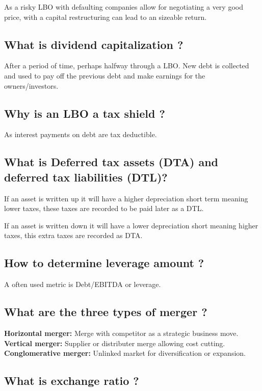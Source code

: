 \documentclass[11pt]{scrartcl} %
\begin{document}
As a risky LBO with defaulting companies allow for negotiating a very good price, with a capital restructuring can lead to an sizeable return.

\subsection{What is dividend capitalization ?}

After a period of time, perhaps halfway through a LBO. New debt is collected and used to pay off the previous debt and make earnings for the owners/investors. 

\subsection{Why is an LBO a tax shield ?}

As interest payments on debt are tax deductible.

\subsection{What is Deferred tax assets (DTA) and deferred tax liabilities (DTL)?}

If an asset is written up it will have a higher depreciation short term meaning lower taxes, these taxes are recorded to be paid later as a DTL.

If an asset is written down it will have a lower depreciation short meaning higher taxes, this extra taxes are recorded as DTA.

\subsection{How to determine leverage amount ?}

A often used metric is Debt/EBITDA or leverage.

\subsection{What are the three types of merger ?}

\textbf{Horizontal merger:} Merge with competitor as a strategic business move.\\
\textbf{Vertical merger:} Supplier or distributer merge allowing cost cutting.\\
\textbf{Conglomerative merger:} Unlinked market for diversification or expansion.

\subsection{What is exchange ratio ?}
\end{document}
